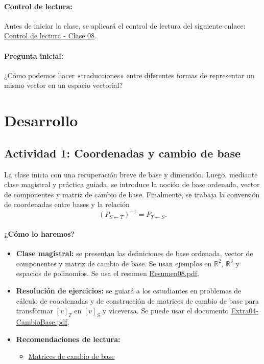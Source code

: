 \documentclass[a4,11pt]{aleph-notas}
\begin{document}
\paragraph{Control de lectura:}
Antes de iniciar la clase, se aplicará el control de lectura del siguiente enlace:
\href{https://gemini.google.com/share/1a9869cf847a}{Control de lectura - Clase 08}.

\paragraph{Pregunta inicial:}
¿Cómo podemos hacer «traducciones» entre diferentes formas de representar un mismo vector en un espacio vectorial? 

\section*{Desarrollo}

\subsection*{Actividad 1: Coordenadas y cambio de base}

La clase inicia con una recuperación breve de base y dimensión. Luego, mediante clase magistral y práctica guiada, se introduce la noción de base ordenada, vector de componentes y matriz de cambio de base. Finalmente, se trabaja la conversión de coordenadas entre bases y la relación
\[
    (P_{S\gets T})^{-1}=P_{T\gets S}.
\]

\paragraph{¿Cómo lo haremos?}
\begin{itemize}[leftmargin=*]
    \item \textbf{Clase magistral:} se presentan las definiciones de base ordenada, vector de componentes y matriz de cambio de base. Se usan ejemplos en $\mathbb{R}^2$, $\mathbb{R}^3$ y espacios de polinomios. Se usa el resumen \href{https://fcena-puce.github.io/AlgebraLineal-05-N0048/01Resumen/Resumen08.pdf}{Resumen08.pdf}.
    \item \textbf{Resolución de ejercicios:} se guiará a los estudiantes en problemas de cálculo de coordenadas y de construcción de matrices de cambio de base para transformar $[v]_T$ en $[v]_S$ y viceversa. Se puede usar el documento \href{https://fcena-puce.github.io/AlgebraLineal-05-N0048/03Extras/Extra04-CambioBase.pdf}{Extra04-CambioBase.pdf}.
    \item \textbf{Recomendaciones de lectura:} 
    \begin{itemize}
        \item \href{https://blog.nekomath.com/algebra-lineal-i-matrices-de-cambio-de-base/}{Matrices de cambio de base}
    \end{itemize}
\end{itemize}
\end{document}
